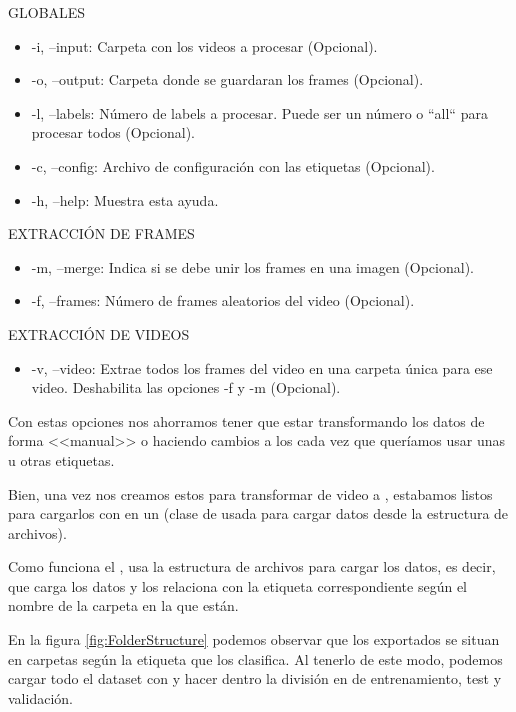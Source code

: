 GLOBALES
\begin{itemize}
  \item -i, --input: Carpeta con los videos a procesar (Opcional).
  \item -o, --output: Carpeta donde se guardaran los frames (Opcional).
  \item -l, --labels: Número de labels a procesar. Puede ser un número o ``all`` para procesar todos (Opcional).
  \item -c, --config: Archivo de configuración con las etiquetas (Opcional).
  \item -h, --help: Muestra esta ayuda.
\end{itemize}

EXTRACCIÓN DE FRAMES
\begin{itemize}
  \item -m, --merge: Indica si se debe unir los frames en una imagen (Opcional).
  \item -f, --frames: Número de frames aleatorios del video (Opcional).
\end{itemize}

EXTRACCIÓN DE VIDEOS
\begin{itemize}
  \item -v, --video: Extrae todos los frames del video en una carpeta única para ese video. Deshabilita las opciones -f y -m (Opcional).
\end{itemize}

Con estas opciones nos ahorramos tener que estar transformando los datos de forma <<manual>> o haciendo cambios a los  cada vez que queríamos usar unas u otras etiquetas.

Bien, una vez nos creamos estos  para transformar de video a , estabamos listos para cargarlos con  en un  (clase de  usada para cargar datos desde la estructura de archivos).

Como funciona el , usa la estructura de archivos para cargar los datos, es decir, que carga los datos y los relaciona con la etiqueta correspondiente según el nombre de la carpeta en la que están.


En la figura \ref{fig:FolderStructure} podemos observar que los  exportados se situan en carpetas según la etiqueta que los clasifica. Al tenerlo de este modo, podemos cargar todo el dataset con  y hacer dentro la división en  de entrenamiento, test y validación.

